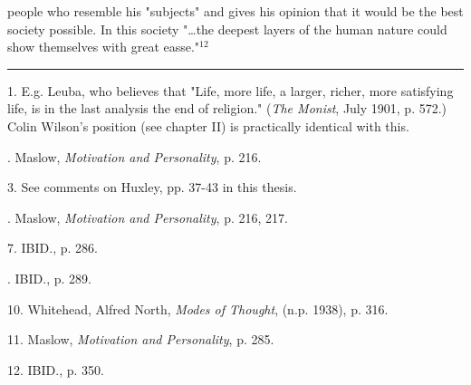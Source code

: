 people who resemble his "subjects" and gives his opinion that it would be the best society possible.
In this society "\dots the deepest layers of the human nature could show themselves with great easse."$^{12}$\par
\vspace*{\fill}
\noindent\rule{0.25\textwidth}{0.4pt}\par
1. E.g. Leuba, who believes that "Life, more life, a larger, richer, more satisfying life, is in the
last analysis the end of religion." (\textit{The Monist}, July 1901, p. 572.) Colin Wilson's
position (see chapter II) is practically identical with this.\par
[2, 4]. Maslow, \textit{Motivation and Personality}, p. 216.\par
3. See comments on Huxley, pp. 37-43 in this thesis.\par
[5, 6]. Maslow, \textit{Motivation and Personality}, p. 216, 217.\par
7. IBID., p. 286.\par
[8, 9]. IBID., p. 289.\par
10. Whitehead, Alfred North, \textit{Modes of Thought}, (n.p. 1938), p. 316.\par
11. Maslow, \textit{Motivation and Personality}, p. 285.\par
12. IBID., p. 350.\par

\newpage

